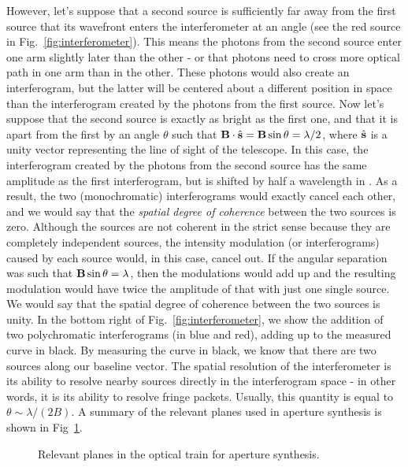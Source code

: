 However, let's suppose that a second source is sufficiently far away from the first source that its wavefront enters the interferometer at an angle (see the red source in Fig.~\ref{fig:interferometer}). This means the photons from the second source enter one arm slightly later than the other - or that photons need to cross more optical path in one arm than in the other. These photons would also create an interferogram, but the latter will be centered about a different position in \OPD  space than the interferogram created by the photons from the first source. Now let's suppose that the second source is exactly as bright as the first one, and that it is apart from the first by an angle $\theta$ such that $\mathbf{B}\cdot\hat{\textrm{\textbf{s}}} = \textrm{\textbf{B}}\sin\theta = \lambda/2$, where $\hat{\textrm{\textbf{s}}}$ is a unity vector representing the line of sight of the telescope. In this case, the interferogram created by the photons from the second source has the same amplitude as the first interferogram, but is shifted by half a wavelength in \OPD. As a result, the two (monochromatic) interferograms would exactly cancel each other, and we would say that the \textit{spatial degree of coherence} between the two sources is zero. Although the sources are not coherent in the strict sense because they are completely independent sources, the intensity modulation (or interferograms) caused by each source would, in this case, cancel out. If the angular separation was such that $\mathbf{B}\sin\theta = \lambda$, then the modulations would add up and the resulting modulation would have twice the amplitude of that with just one single source. We would say that the spatial degree of coherence between the two sources is unity. In the bottom right of Fig.~\ref{fig:interferometer}, we show the addition of two polychromatic interferograms (in blue and red), adding up to the measured curve in black. By measuring the curve in black, we know that there are two sources along our baseline vector. The spatial resolution of the interferometer is its ability to resolve nearby sources directly in the interferogram space - in other words, it is its ability to resolve fringe packets. Usually, this quantity is equal to $\theta\sim\lambda/(2B)$. A summary of the relevant planes used in aperture synthesis is shown in Fig~\ref{fig:aperturesynthesis}.

\begin{figure}[!h]
	\centering
	
	\caption[Aperture synthesis]{Relevant planes in the optical train for aperture synthesis.}
	\label{fig:aperturesynthesis}
    \end{figure}



